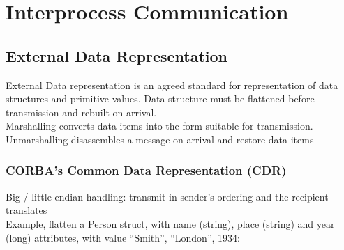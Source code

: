 \chapter{Interprocess Communication}

\section{External Data Representation}

\noindent External Data representation is an agreed standard for representation of data structures and primitive values. Data structure must be flattened before transmission and rebuilt on arrival. \\

\noindent Marshalling converts data items into the form suitable for transmission. Unmarshalling disassembles a message on arrival and restore data items\\

\subsection{CORBA’s Common Data Representation (CDR)}

\noindent Big / little-endian handling: transmit in sender’s ordering and the recipient translates\\

\noindent Example, flatten a Person struct, with name (string), place (string) and year (long) attributes, with value {“Smith”, “London”, 1934}:\\
